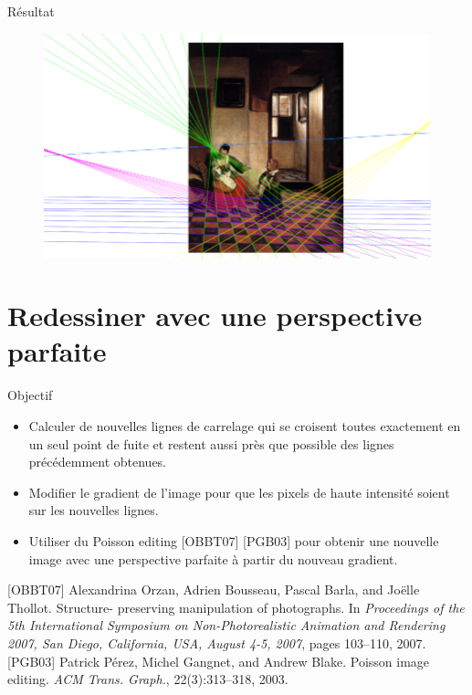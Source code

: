 \documentclass{beamer}
\begin{document}
\begin{frame}
\begin{figure}[h]
{}
		\end{figure}
	\end{frame}

	\begin{frame}{Résultat}
		\begin{figure}[h]
			\centering
			\includegraphics[width=\linewidth]{final.png}
		\end{figure}
	\end{frame}

	\section{Redessiner avec une perspective parfaite}
	
	\begin{frame}{Objectif}
		\begin{itemize}
			\small \item Calculer de nouvelles lignes de carrelage qui se croisent toutes exactement en un seul point de fuite et restent aussi près que possible des lignes précédemment obtenues.
			\small \item Modifier le gradient de l'image pour que les pixels de haute intensité soient sur les nouvelles lignes.
			\small \item Utiliser du Poisson editing [OBBT07] [PGB03] pour obtenir une nouvelle image avec une perspective parfaite à partir du nouveau gradient.
		\end{itemize}
		{\tiny [OBBT07] Alexandrina Orzan, Adrien Bousseau, Pascal Barla, and Joëlle Thollot. Structure-
		preserving manipulation of photographs. In \textit{Proceedings of the 5th International Symposium on Non-Photorealistic Animation and Rendering 2007, San Diego, California, USA, August 4-5, 2007}, pages 103–110, 2007. }
		{\tiny [PGB03] Patrick Pérez, Michel Gangnet, and Andrew Blake. Poisson image editing. \textit{ACM Trans. Graph.}, 22(3):313–318, 2003. }
	\end{frame}
\end{document}
